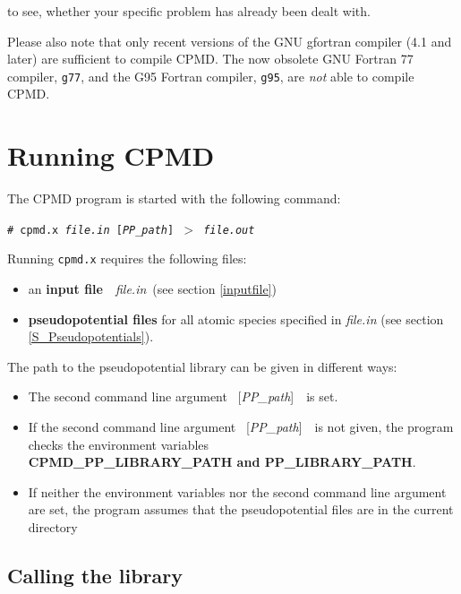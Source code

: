 \documentclass[twoside,10pt,titlepage,a4paper]{article}
\newcommand{\shellcommand}[1]{%
  \vspace*{3mm}
  \noindent
  \texttt{\# #1}
  \vspace*{3mm}
}
\begin{document}
  to see, whether your specific problem has already been dealt with.

\vspace{7mm}
  Please also note that only recent versions of the GNU gfortran compiler
  (4.1 and later) are sufficient to compile CPMD. The now obsolete GNU 
  Fortran 77 compiler, \texttt{g77}, and the G95 Fortran compiler, 
  \texttt{g95}, are {\em not} able to compile CPMD.
  \clearpage
\section{Running CPMD}\label{runcpmd}
%
The CPMD program is started with the following command:

\shellcommand{cpmd.x {\sl file.in} [{\sl PP\_path}] $>$ {\sl file.out}}

Running \texttt{cpmd.x} requires the following files:
\begin{itemize}
  \item an {\bf input file}\ \ {\sl file.in}\ (see section \ref{inputfile})

  \item {\bf pseudopotential files} for all atomic species specified
        in {\sl file.in} (see section \ref{S_Pseudopotentials}).
\end{itemize}

\bigskip

The path to the pseudopotential library can be given in different ways:
\begin{itemize}

\item The second command line argument \ [{\sl PP\_path}]\ \ is set.

\item If the second command line argument \ [{\sl PP\_path}]\ \ is not
  given, the program checks the environment variables\\ {\bf
    CPMD\_PP\_LIBRARY\_PATH and PP\_LIBRARY\_PATH}.

\item If neither the environment variables nor the second command line
  argument are set, the program assumes that the pseudopotential files are
  in the current directory
\end{itemize}

\subsection{Calling the library}\label{libcpmd}
\end{document}
